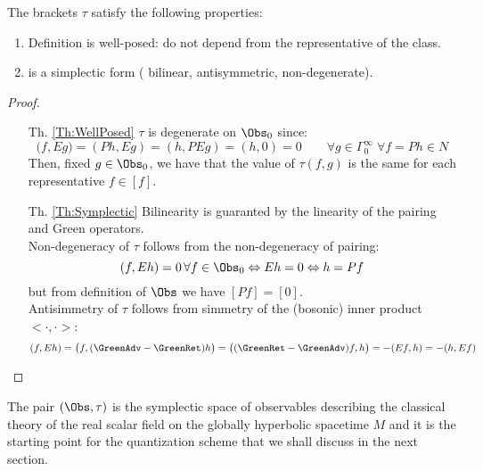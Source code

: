 \documentclass[Main]{subfiles}
\begin{document}
				\begin{proposition}
				The brackets  $\tau$ satisfy the following properties:
					\begin{enumerate}
						\item\label{Th:WellPosed} Definition is well-posed: do not depend from the representative of the class.
						\item\label{Th:Symplectic} is a simplectic form ( bilinear, antisymmetric, non-degenerate).		
					\end{enumerate}
				\end{proposition}
				\begin{proof}
					\begin{itemize}
						\item [Th. \ref{Th:WellPosed}]
							 $\tau$ is degenerate on $\Obs_0$ since:
							 \begin{displaymath}
							 	\big( f , E g \big) = (P h , E g) = (h, PE g) = (h,0) = 0 \qquad \forall g \in \Gamma_0^\infty \; \forall f=Ph \in N
							 \end{displaymath}
							 Then, fixed $g\in \Obs_0$, we have that the value of $\tau(f,g)$ is the same for each representative $f\in[f]$.

						\item [Th. \ref{Th:Symplectic}]	
							Bilinearity is guaranted by the linearity of the pairing and Green operators.\\
							Non-degeneracy of $\tau$ follows from the non-degeneracy of pairing:
							\begin{displaymath}
								(f, E h) = 0 \, \forall f \in \Obs_0 \Leftrightarrow E h = 0 \Leftrightarrow h = P f
							\end{displaymath}
							but from definition of $\Obs$ we have $[Pf] = [0]$.\\
							Antisimmetry of $\tau $ follows from simmetry of the (bosonic) inner product $< \cdot, \cdot>$:
							\begin{displaymath}
								( f , E h ) =\big(f, (\GreenAdv - \GreenRet ) h \big)= \big( ( \GreenRet - \GreenAdv) f , h \big) = - ( Ef , h) = -(h, Ef)
							\end{displaymath}							 
					\end{itemize}
				\end{proof}
				The pair $(\Obs,\tau)$ is the symplectic space of observables describing the classical theory of the real scalar field on the globally hyperbolic spacetime $M$ and it is the starting point for the quantization scheme that we shall discuss in the next section.
\end{document}
